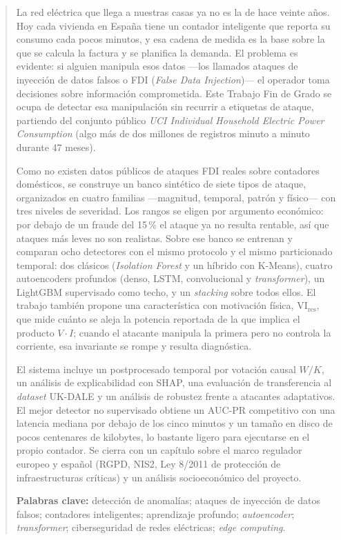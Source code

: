\documentclass[12pt]{report}
\theoremstyle{remark}
\newcommand{\vires}{\mathrm{VI}_{\text{res}}}
\begin{document}
\renewcommand\abstractname{\large\bfseries\filcenter\uppercase{Resumen}}
\begin{abstract}
\thispagestyle{plain}
\setcounter{page}{3}

	La red eléctrica que llega a nuestras casas ya no es la de hace veinte años. Hoy cada vivienda en España tiene un contador inteligente que reporta su consumo cada pocos minutos, y esa cadena de medida es la base sobre la que se calcula la factura y se planifica la demanda. El problema es evidente: si alguien manipula esos datos ---los llamados ataques de inyección de datos falsos o FDI (\textit{False Data Injection})--- el operador toma decisiones sobre información comprometida. Este Trabajo Fin de Grado se ocupa de detectar esa manipulación sin recurrir a etiquetas de ataque, partiendo del conjunto público \textit{UCI Individual Household Electric Power Consumption} (algo más de dos millones de registros minuto a minuto durante 47 meses).

	Como no existen datos públicos de ataques FDI reales sobre contadores domésticos, se construye un banco sintético de siete tipos de ataque, organizados en cuatro familias ---magnitud, temporal, patrón y físico--- con tres niveles de severidad. Los rangos se eligen por argumento económico: por debajo de un fraude del 15\,\% el ataque ya no resulta rentable, así que ataques más leves no son realistas. Sobre ese banco se entrenan y comparan ocho detectores con el mismo protocolo y el mismo particionado temporal: dos clásicos (\textit{Isolation Forest} y un híbrido con K\nobreakdash-Means), cuatro autoencoders profundos (denso, LSTM, convolucional y \textit{transformer}), un LightGBM supervisado como techo, y un \textit{stacking} sobre todos ellos. El trabajo también propone una característica con motivación física, $\vires$, que mide cuánto se aleja la potencia reportada de la que implica el producto $V\cdot I$; cuando el atacante manipula la primera pero no controla la corriente, esa invariante se rompe y resulta diagnóstica.

	El sistema incluye un postprocesado temporal por votación causal $W/K$, un análisis de explicabilidad con SHAP, una evaluación de transferencia al \textit{dataset} UK-DALE y un análisis de robustez frente a atacantes adaptativos. El mejor detector no supervisado obtiene un AUC-PR competitivo con una latencia mediana por debajo de los cinco minutos y un tamaño en disco de pocos centenares de kilobytes, lo bastante ligero para ejecutarse en el propio contador. Se cierra con un capítulo sobre el marco regulador europeo y español (RGPD, NIS2, Ley 8/2011 de protección de infraestructuras críticas) y un análisis socioeconómico del proyecto.

	\textbf{Palabras clave:} detección de anomalías; ataques de inyección de datos falsos; contadores inteligentes; aprendizaje profundo; \textit{autoencoder}; \textit{transformer}; ciberseguridad de redes eléctricas; \textit{edge computing}.

	\vfill
\end{abstract}
	\newpage
	\thispagestyle{empty}
	\mbox{}
\end{document}
